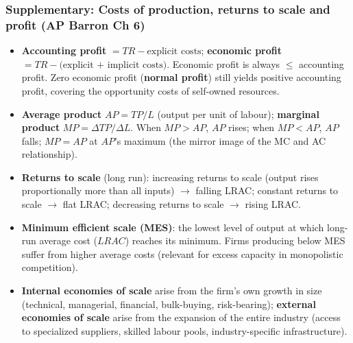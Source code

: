 \documentclass[a4paper,12pt]{article}
\newcommand{\needbold}[1]{\textcolor{red!70!black}{\textbf{#1}}}
\begin{document}
\subsubsection*{Supplementary: Costs of production, returns to scale and profit (AP Barron Ch 6)}
\begin{itemize}
  \item \needbold{Accounting profit} $= TR - \text{explicit costs}$; \needbold{economic profit} $= TR - \text{(explicit + implicit costs)}$. Economic profit is always $\leq$ accounting profit. Zero economic profit (\textbf{normal profit}) still yields positive accounting profit, covering the opportunity costs of self-owned resources.
  \item \needbold{Average product} $AP = TP/L$ (output per unit of labour); \needbold{marginal product} $MP = \Delta TP/\Delta L$. When $MP > AP$, $AP$ rises; when $MP < AP$, $AP$ falls; $MP = AP$ at $AP$'s maximum (the mirror image of the MC and AC relationship).
  \item \needbold{Returns to scale} (long run): increasing returns to scale (output rises proportionally more than all inputs) $\to$ falling LRAC; constant returns to scale $\to$ flat LRAC; decreasing returns to scale $\to$ rising LRAC.
  \item \needbold{Minimum efficient scale (MES)}: the lowest level of output at which long-run average cost ($LRAC$) reaches its minimum. Firms producing below MES suffer from higher average costs (relevant for excess capacity in monopolistic competition).
  \item \needbold{Internal economies of scale} arise from the firm's own growth in size (technical, managerial, financial, bulk-buying, risk-bearing); \needbold{external economies of scale} arise from the expansion of the entire industry (access to specialized suppliers, skilled labour pools, industry-specific infrastructure).
\end{itemize}
\end{document}
